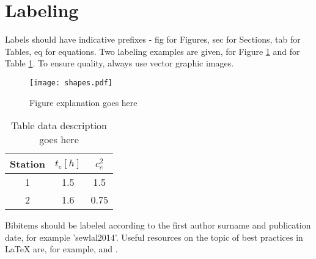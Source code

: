 \section{Labeling}
\label{sec:labeling}

Labels should have indicative prefixes - fig for Figures, sec for Sections, tab for Tables, eq for equations. Two labeling examples are given, for Figure \ref{fig:shapes} and for Table \ref{tab:experiment1_data}. To ensure quality, always use vector graphic images. 

\begin{figure}[ht!]
	\centering
		\texttt{[image: shapes.pdf]}
	\caption{Figure explanation goes here}
	\label{fig:shapes}
\end{figure}

\begin{table}[ht!]
	\centering
	\begin{tabular}{ccc}
		\toprule
		Station & $t_e [h]$ & $c_e^2$ \\
		\midrule
		1       & 1.5       & 1.5\\
		2       & 1.6       & 0.75\\
		\bottomrule
	\end{tabular}
	\caption{Table data description goes here}
	\label{tab:experiment1_data}
\end{table}

Bibitems should be labeled according to the first author surname and publication date, for example 'sewlal2014'. Useful resources on the topic of best practices in LaTeX are, for example, \cite{sewlal2014} and \cite{birotic2015}.



